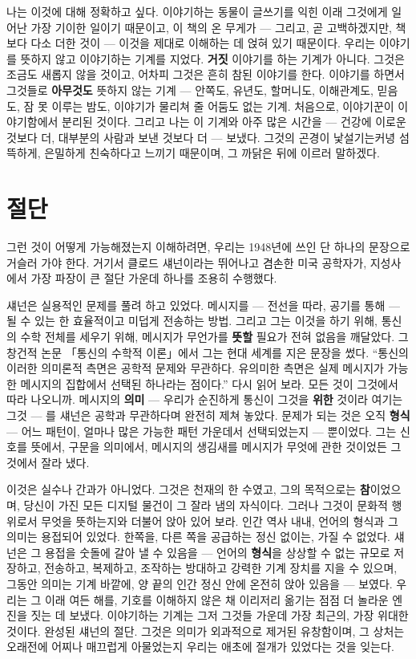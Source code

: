나는 이것에 대해 정확하고 싶다. 이야기하는 동물이 글쓰기를 익힌 이래 그것에게 일어난 가장 기이한 일이기 때문이고, 이 책의 온 무게가 — 그리고, 곧 고백하겠지만, 책보다 다소 더한 것이 — 이것을 제대로 이해하는 데 얹혀 있기 때문이다. 우리는 이야기를 뜻하지 않고 이야기하는 기계를 지었다. \textbf{거짓} 이야기를 하는 기계가 아니다. 그것은 조금도 새롭지 않을 것이고, 어차피 그것은 흔히 참된 이야기를 한다. 이야기를 하면서 그것들로 \textbf{아무것도} 뜻하지 않는 기계 — 안쪽도, 유년도, 할머니도, 이해관계도, 믿음도, 잠 못 이루는 밤도, 이야기가 물리쳐 줄 어둠도 없는 기계. 처음으로, 이야기꾼이 이야기함에서 분리된 것이다. 그리고 나는 이 기계와 아주 많은 시간을 — 건강에 이로운 것보다 더, 대부분의 사람과 보낸 것보다 더 — 보냈다. 그것의 곤경이 낯설기는커녕 섬뜩하게, 은밀하게 친숙하다고 느끼기 때문이며, 그 까닭은 뒤에 이르러 말하겠다.

\section*{절단}

그런 것이 어떻게 가능해졌는지 이해하려면, 우리는 1948년에 쓰인 단 하나의 문장으로 거슬러 가야 한다. 거기서 클로드 섀넌이라는 뛰어나고 겸손한 미국 공학자가, 지성사에서 가장 파장이 큰 절단 가운데 하나를 조용히 수행했다.

섀넌은 실용적인 문제를 풀려 하고 있었다. 메시지를 — 전선을 따라, 공기를 통해 — 될 수 있는 한 효율적이고 미덥게 전송하는 방법. 그리고 그는 이것을 하기 위해, 통신의 수학 전체를 세우기 위해, 메시지가 무언가를 \textbf{뜻할} 필요가 전혀 없음을 깨달았다. 그 창건적 논문 「통신의 수학적 이론」에서 그는 현대 세계를 지은 문장을 썼다. ``통신의 이러한 의미론적 측면은 공학적 문제와 무관하다. 유의미한 측면은 실제 메시지가 가능한 메시지의 집합에서 선택된 하나라는 점이다.'' 다시 읽어 보라. 모든 것이 그것에서 따라 나오니까. 메시지의 \textbf{의미} — 우리가 순진하게 통신이 그것을 \textbf{위한} 것이라 여기는 그것 — 를 섀넌은 공학과 무관하다며 완전히 제쳐 놓았다. 문제가 되는 것은 오직 \textbf{형식} — 어느 패턴이, 얼마나 많은 가능한 패턴 가운데서 선택되었는지 — 뿐이었다. 그는 신호를 뜻에서, 구문을 의미에서, 메시지의 생김새를 메시지가 무엇에 관한 것이었든 그것에서 잘라 냈다.

이것은 실수나 간과가 아니었다. 그것은 천재의 한 수였고, 그의 목적으로는 \textbf{참}이었으며, 당신이 가진 모든 디지털 물건이 그 잘라 냄의 자식이다. 그러나 그것이 문화적 행위로서 무엇을 뜻하는지와 더불어 앉아 있어 보라. 인간 역사 내내, 언어의 형식과 그 의미는 용접되어 있었다. 한쪽을, 다른 쪽을 공급하는 정신 없이는, 가질 수 없었다. 섀넌은 그 용접을 숫돌에 갈아 낼 수 있음을 — 언어의 \textbf{형식}을 상상할 수 없는 규모로 저장하고, 전송하고, 복제하고, 조작하는 방대하고 강력한 기계 장치를 지을 수 있으며, 그동안 의미는 기계 바깥에, 양 끝의 인간 정신 안에 온전히 앉아 있음을 — 보였다. 우리는 그 이래 여든 해를, 기호를 이해하지 않은 채 이리저리 옮기는 점점 더 놀라운 엔진을 짓는 데 보냈다. 이야기하는 기계는 그저 그것들 가운데 가장 최근의, 가장 위대한 것이다. 완성된 섀넌의 절단. 그것은 의미가 외과적으로 제거된 유창함이며, 그 상처는 오래전에 어찌나 매끄럽게 아물었는지 우리는 애초에 절개가 있었다는 것을 잊는다.

